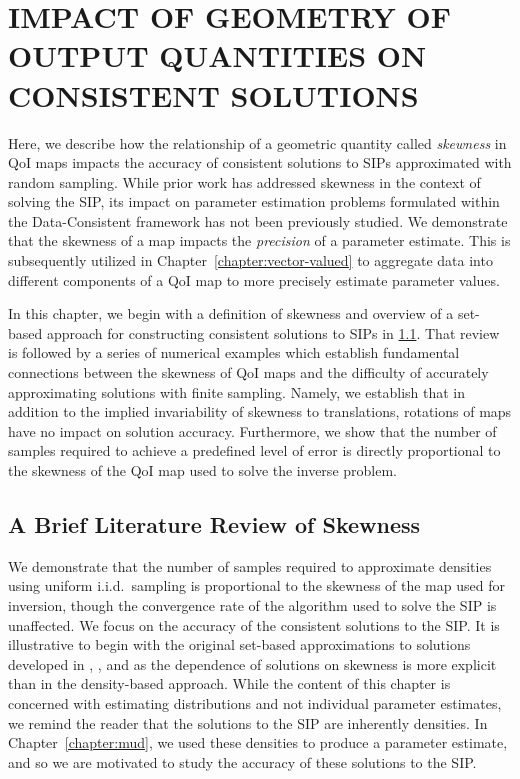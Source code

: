 \chapter{\uppercase{Impact of Geometry of Output Quantities on Consistent Solutions} \label{chapter:geometry}}

Here, we describe how the relationship of a geometric quantity called \emph{skewness} in QoI maps impacts the accuracy of consistent solutions to SIPs approximated with random sampling.
While prior work has addressed skewness in the context of solving the SIP, its impact on parameter estimation problems formulated within the Data-Consistent framework has not been previously studied.
We demonstrate that the skewness of a map impacts the \emph{precision} of a parameter estimate.
This is subsequently utilized in Chapter~\ref{chapter:vector-valued} to aggregate data into different components of a QoI map to more precisely estimate parameter values.

In this chapter, we begin with a definition of skewness and overview of a set-based approach for constructing consistent solutions to SIPs in \ref{sec:skewness}.
That review is followed by a series of numerical examples which establish fundamental connections between the skewness of QoI maps and the difficulty of accurately approximating solutions with finite sampling.
Namely, we establish that in addition to the implied invariability of skewness to translations, rotations of maps have no impact on solution accuracy.
Furthermore, we show that the number of samples required to achieve a predefined level of error is directly proportional to the skewness of the QoI map used to solve the inverse problem.

\section{A Brief Literature Review of Skewness}\label{sec:skewness}


We demonstrate that the number of samples required to approximate densities using uniform i.i.d.~sampling is proportional to the skewness of the map used for inversion, though the convergence rate of the algorithm used to solve the SIP is unaffected.
We focus on the accuracy of the consistent solutions to the SIP.
It is illustrative to begin with the original set-based approximations to solutions developed in \cite{BBE11}, \cite{BES12}, and \cite{BET+14} as the dependence of solutions on skewness is more explicit than in the density-based approach.
While the content of this chapter is concerned with estimating distributions and not individual parameter estimates, we remind the reader that the solutions to the SIP are inherently densities.
In Chapter~\ref{chapter:mud}, we used these densities to produce a parameter estimate, and so we are motivated to study the accuracy of these solutions to the SIP.



